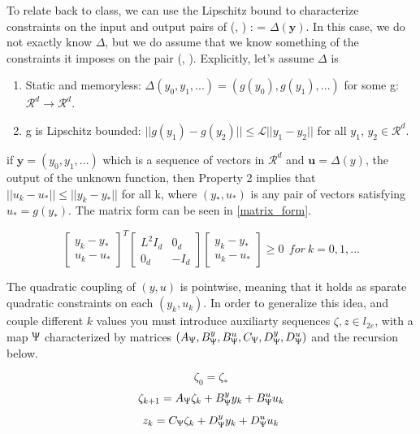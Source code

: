 \documentclass{article}[12pt]
\begin{document}
\noindent To relate back to class, we can use the Lipschitz bound to characterize constraints on the input and output pairs of (, ) :  = $\Delta (\boldsymbol{y})$. In this case, we do not exactly know $\Delta$, but we do assume that we know something of the constraints it imposes on the pair (, ). Explicitly, let's assume $\Delta$ is 
\begin{enumerate}
    \item Static and memoryless: $\Delta(y_0, y_1, ...) = (g(y_0),g(y_1),...)$ for some g: $\mathcal{R}^d \xrightarrow{} \mathcal{R}^d$.
    \item g is Lipschitz bounded: $||g(y_1) - g(y_2)|| \leq \mathcal{L}||y_1 - y_2||$ for all $y_1$, $y_2 \in \mathcal{R}^d$.
\end{enumerate}

\noindent if $\boldsymbol{y} = (y_0,y_1,...)$ which is a sequence of vectors in $\mathcal{R}^d$ and $\boldsymbol{u} = \Delta (y)$, the output of the unknown function, then Property 2 implies that $||u_k - u_*|| \leq ||y_k - y_*||$ for all k, where $(y_*,u_*)$ is any pair of vectors satisfying $u_* = g(y_*)$. The matrix form can be seen in \ref{matrix_form}.

\begin{equation}
    \label{matrix_form}
    \begin{bmatrix}
        y_k - y_* \\
         u_k - u_*
    \end{bmatrix}^T
    \begin{bmatrix}
        L^2 I_d & 0_d\\
         0_d & -I_d
     \end{bmatrix}
     \begin{bmatrix}
        y_k - y_* \\
         u_k - u_*
    \end{bmatrix} \geq 0 \: \: for\: k = 0,1,...
\end{equation}

\noident The quadratic coupling of $(y,u)$ is pointwise, meaning that it holds as sparate quadratic constraints on each $(y_k, u_k)$. In order to generalize this idea, and couple different $k$ values you must introduce auxiliarty sequences $\zeta , z \in l_{2e}$, with a map $\Uppsi$ characterized by matrices $(A_\Uppsi, B^y_\Uppsi, B^u_\Uppsi, C_\Uppsi, D^y_\Uppsi, D^u_\Uppsi)$ and the recursion below.

\begin{equation}
    \label{eq_3.2a}
    \zeta_0 = \zeta_*
\end{equation}
\begin{equation}
    \label{eq_3.2b}
    \zeta_{k+1} = A_\Uppsi \zeta_k + B^y_\Uppsi y_k + B^u_\Uppsi u_k
\end{equation}
\begin{equation}
    \label{eq_3.2c}
    z_k = C_\Uppsi \zeta_k+ D^y_\Uppsi y_k+ D^u_\Uppsi u_k
\end{equation}
\end{document}
